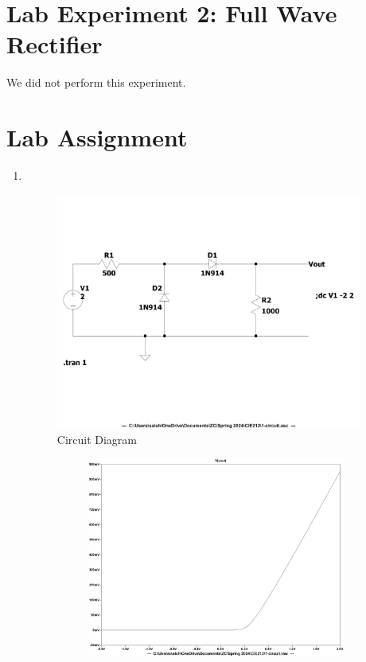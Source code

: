 \documentclass{zc-ust-hw}
\begin{document}
    \newpage

\section{Lab Experiment 2: Full Wave Rectifier}

We did not perform this experiment.

\section{Lab Assignment}

\begin{enumerate}
  \item \,
    \begin{figure}[H]
      \centering
      \includegraphics[width=0.95\textwidth]{figures/1-circuit.pdf}
      \caption{Circuit Diagram}
    \end{figure}
    \begin{figure}[H]
      \centering
      \begin{subfigure}{0.45\textwidth}
        \centering
        \includegraphics[width=\textwidth]{figures/1-dc-sweep.pdf}

\end{subfigure}
\end{figure}
\end{enumerate}
\end{document}
